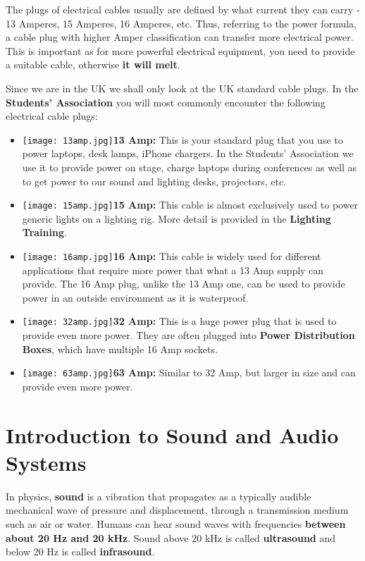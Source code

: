 \documentclass[14pt]{article} %
\let\Oldsection\section
\renewcommand{\section}{\FloatBarrier\Oldsection}
\begin{document}
The plugs of electrical cables usually are defined by what current they can carry - 13 Amperes, 15 Amperes, 16 Amperes, etc. Thus, referring to the power formula, a cable plug with higher Amper classification can transfer more electrical power. This is important as for more powerful electrical equipment, you need to provide a suitable cable, otherwise \textbf{it will melt}.

Since we are in the UK we shall only look at the UK standard cable plugs. In the \textbf{Students' Association} you will most commonly encounter the following electrical cable plugs:

\begin{itemize}

\item \texttt{[image: 13amp.jpg]}\textbf{13 Amp:} This is your standard plug that you use to power laptops, desk lamps, iPhone chargers. In the Students' Association we use it to provide power on stage, charge laptops during conferences as well as to get power to our sound and lighting desks, projectors, etc.  

\item \texttt{[image: 15amp.jpg]}\textbf{15 Amp:} This cable is almost exclusively used to power generic lights on a lighting rig. More detail is provided in the \textbf{Lighting Training}. 

\item \texttt{[image: 16amp.jpg]}\textbf{16 Amp:} This cable is widely used for different applications that require more power that what a 13 Amp supply can provide. The 16 Amp plug, unlike the 13 Amp one, can be used to provide power in an outside environment as it is waterproof. 

\item \texttt{[image: 32amp.jpg]}\textbf{32 Amp:} This is a huge power plug that is used to provide even more power. They are often plugged into \textbf{Power Distribution Boxes}, which have multiple 16 Amp sockets. 

\item \texttt{[image: 63amp.jpg]}\textbf{63 Amp:} Similar to 32 Amp, but larger in size and can provide even more power.

\end{itemize}


\section{Introduction to Sound and Audio Systems}
\label{intro-sound}
In physics, \textbf{sound} is a vibration that propagates as a typically audible mechanical wave of pressure and displacement, through a transmission medium such as air or water. Humans can hear sound waves with frequencies \textbf{between about 20 Hz and 20 kHz}. Sound above 20 kHz is called \textbf{ultrasound} and below 20 Hz is called \textbf{infrasound}.
\end{document}
